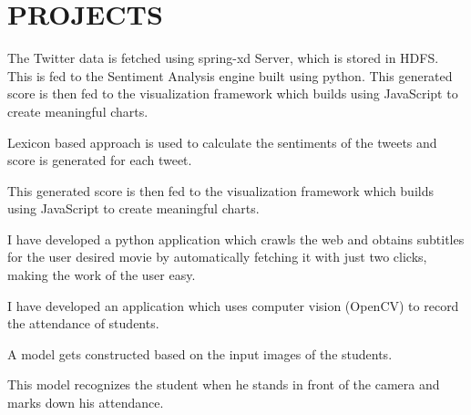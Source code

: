\documentclass[]{deedy-resume-openfont}
\begin{document}
\begin{minipage}[t]{0.66\textwidth} 


\section{PROJECTS}


\vspace{\topsep} %
\begin{tightemize}
\item The Twitter data is fetched using spring-xd Server, which is stored in HDFS. 
This is fed to the Sentiment Analysis engine built using python.  This generated score is then fed to the visualization framework which builds using JavaScript to create meaningful charts.
\item  Lexicon based approach is used to calculate the sentiments of the tweets and score is generated for each tweet.
\item  This generated score is then fed to the visualization framework which builds using JavaScript to create meaningful charts.
\end{tightemize}
\sectionsep


\begin{tightemize}
\item  I have developed a python application which crawls the web and obtains subtitles for the user desired movie by automatically fetching it with just two clicks, making the work of the user easy.


\end{tightemize}
\sectionsep


\begin{tightemize}
\item I have developed an application which uses computer vision (OpenCV) to record the attendance of students.
\item A model gets constructed based on the input images of the students. 
\item This model recognizes the student when he stands in front of the camera and marks down his attendance.
\end{tightemize}
\sectionsep
\sectionsep


\end{minipage}
\end{document}
